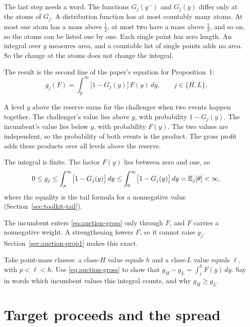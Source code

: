 The last step needs a word. The functions \(G_j(y^-)\) and \(G_j(y)\) differ only at the atoms of \(G_j\). A
distribution function has at most countably many atoms. At most one atom has a mass above \(\tfrac12\), at most
two have a mass above \(\tfrac13\), and so on, so the atoms can be listed one by one. Each single point has zero
length. An integral over \(y\) measures area, and a countable list of single points adds no area. So the change at
the atoms does not change the integral.

The result is the second line of the paper's equation for Proposition~1:
\begin{equation}\label{eq:auction-gross}
g_j(F)=\int_p^\infty\bigl[1-G_j(y)\bigr]\,F(y)\,dy,\qquad j\in\{H,L\}.
\end{equation}

\begin{intuition}
A level \(y\) above the reserve earns for the challenger when two events happen together. The challenger's value
lies above \(y\), with probability \(1-G_j(y)\). The incumbent's value lies below \(y\), with probability
\(F(y)\). The two values are independent, so the probability of both events is the product. The gross profit
adds these products over all levels above the reserve.
\end{intuition}

The integral is finite. The factor \(F(y)\) lies between zero and one, so
\[
0\le g_j\le\int_p^\infty\bigl[1-G_j(y)\bigr]\,dy\le\int_0^\infty\bigl[1-G_j(y)\bigr]\,dy=\mathbb{E}_j[\theta]<\infty,
\]
where the equality is the tail formula for a nonnegative value (Section~\ref{sec:toolkit-tail}).

The incumbent enters \eqref{eq:auction-gross} only through \(F\), and \(F\) carries a nonnegative weight. A
strengthening lowers \(F\), so it cannot raise \(g_j\). Section~\ref{sec:auction-prop1} makes this exact.

\begin{checkyourself}
\label{q:auction-pointgross}
Take point-mass classes: a class-\(H\) value equals \(h\) and a class-\(L\) value equals \(\ell\), with
\(p<\ell<h\). Use \eqref{eq:auction-gross} to show that \(g_H-g_L=\int_\ell^hF(y)\,dy\). Say in words which
incumbent values this integral counts, and why \(g_H\ge g_L\).
\end{checkyourself}

\section{Target proceeds and the spread}\label{sec:auction-spread}

